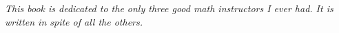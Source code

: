 \null\vfill

\begingroup\centering

{\large \itshape
This book is dedicated to the only three good math instructors I ever had. It is written in spite of all the others.
}

\endgroup

\vfill

\cleardoublepage